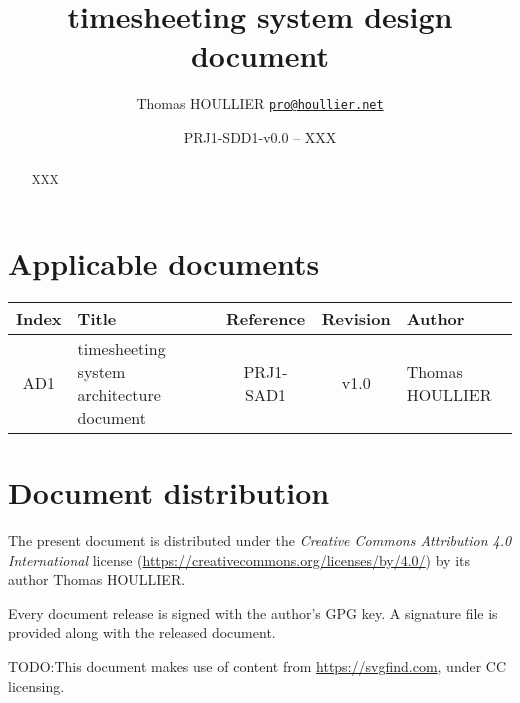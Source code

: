 \documentclass[letterpaper]{article}
\title{timesheeting system design document}
\author{Thomas HOULLIER \href{mailto:pro@houllier.net}
         {\texttt{\textlangle pro@houllier.net\textrangle}}}
\begin{document}
\frenchspacing
\date{PRJ1-SDD1-v0.0 -- XXX}
\maketitle
\thispagestyle{FirstPage}

\begin{abstract}
  XXX
\end{abstract}

\begin{versionhistory}
\end{versionhistory}
\setcounter{table}{0} %

\section*{Applicable documents}
{ \centering
  \begin{tabularx}{\textwidth}{| c | X | c | c | X |} \hline
    Index & Title & Reference & Revision & Author \\ \hline
    AD1 & timesheeting system architecture document & PRJ1-SAD1 & v1.0 & Thomas
    HOULLIER \\ \hline
  \end{tabularx} \par }

\section*{Document distribution}
The present document is distributed under the \emph{Creative Commons Attribution
  4.0 International} license (\url{https://creativecommons.org/licenses/by/4.0/})
by its author Thomas HOULLIER.

Every document release is signed with the author's GPG key. A signature file
is provided along with the released document.

TODO:This document makes use of content from \url{https://svgfind.com}, under
CC licensing.

\tableofcontents
\printglossary[type=\acronymtype,style=index]
\pagestyle{plain}







\appendix


\apptocmd{\thebibliography}{\raggedright}{}{}
\begingroup
{}
\setlength\bibitemsep{0pt}
\printbibliography
\endgroup
\end{document}
